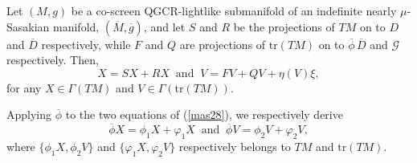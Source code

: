 \documentclass[reqno, 12pt]{amsart}
\numberwithin{equation}{section}
\begin{document}
Let $(M,g)$ be a co-screen QGCR-lightlike submanifold of an indefinite nearly $\mu$-Sasakian manifold, $(\overline{M},\overline{g})$, and let $S$ and $R$ be the projections of $TM$ on to $D$ and $\overline{D}$ respectively, while $F$ and $Q$ are projections of $\mathrm{tr}(TM)$ on to $\overline{\phi}\, \overline{D}$ and $\mathcal{G}$ respectively. Then, 
\begin{equation}\label{mas28}
 X=SX+RX\;\;\mbox{and}\;\;V=FV+QV+\eta(V)\xi,
\end{equation}
for any $X\in\Gamma(TM)$ and $V\in\Gamma(\mathrm{tr}(TM))$.

Applying $\overline{\phi}$ to the two equations of (\ref{mas28}), we respectively derive 
\begin{equation}\label{mas29}
 \overline{\phi}X=\phi_{1}X+\varphi_{1}X\;\;\mbox{and}\;\;\overline{\phi}V=\phi_{2} V+\varphi_{2}V,
\end{equation}
where $\{\phi_{1}X, \phi_{2} V\}$  and $\{\varphi_{1}X,\varphi_{2}V\}$ respectively belongs to $TM$ and $\mathrm{tr}(TM)$.
\end{document}
